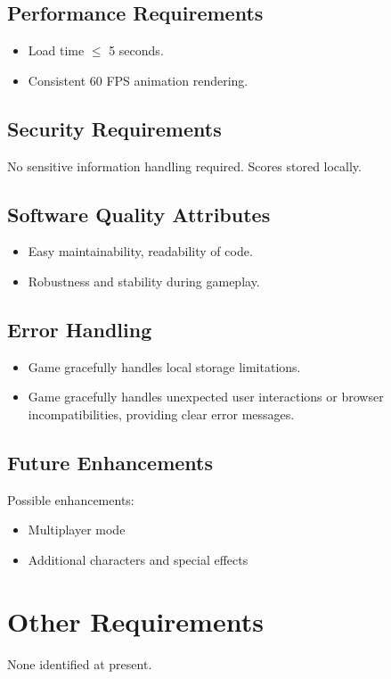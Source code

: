 \documentclass{scrreprt}
\begin{document}
\section{Performance Requirements}
\begin{itemize}
    \item Load time $\leq$ 5 seconds.
    \item Consistent 60 FPS animation rendering.
\end{itemize}

\section{Security Requirements}
No sensitive information handling required. Scores stored locally.

\section{Software Quality Attributes}
\begin{itemize}
    \item Easy maintainability, readability of code.
    \item Robustness and stability during gameplay.
\end{itemize}

\section{Error Handling}
\begin{itemize}
    \item Game gracefully handles local storage limitations.
    \item Game gracefully handles unexpected user interactions or browser incompatibilities, providing clear error messages.
\end{itemize}

\section{Future Enhancements}
Possible enhancements:
\begin{itemize}
    \item Multiplayer mode
    \item Additional characters and special effects
\end{itemize}

\chapter{Other Requirements}
None identified at present.
\end{document}
